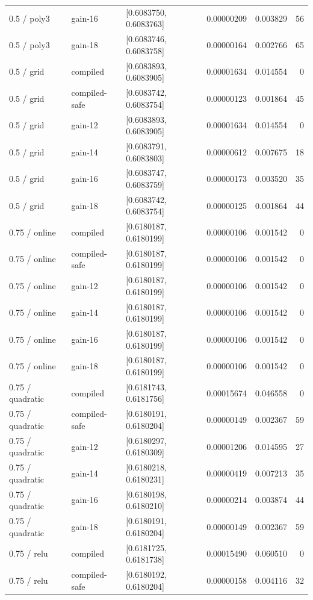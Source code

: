 \begin{longtable}{@{}lllrrr@{}}
0.5 / poly3 & gain-16 & [0.6083750, 0.6083763] & 0.00000209 & 0.003829 & 56\\
0.5 / poly3 & gain-18 & [0.6083746, 0.6083758] & 0.00000164 & 0.002766 & 65\\
0.5 / grid & compiled & [0.6083893, 0.6083905] & 0.00001634 & 0.014554 & 0\\
0.5 / grid & compiled-safe & [0.6083742, 0.6083754] & 0.00000123 & 0.001864 & 45\\
0.5 / grid & gain-12 & [0.6083893, 0.6083905] & 0.00001634 & 0.014554 & 0\\
0.5 / grid & gain-14 & [0.6083791, 0.6083803] & 0.00000612 & 0.007675 & 18\\
0.5 / grid & gain-16 & [0.6083747, 0.6083759] & 0.00000173 & 0.003520 & 35\\
0.5 / grid & gain-18 & [0.6083742, 0.6083754] & 0.00000125 & 0.001864 & 44\\
0.75 / online & compiled & [0.6180187, 0.6180199] & 0.00000106 & 0.001542 & 0\\
0.75 / online & compiled-safe & [0.6180187, 0.6180199] & 0.00000106 & 0.001542 & 0\\
0.75 / online & gain-12 & [0.6180187, 0.6180199] & 0.00000106 & 0.001542 & 0\\
0.75 / online & gain-14 & [0.6180187, 0.6180199] & 0.00000106 & 0.001542 & 0\\
0.75 / online & gain-16 & [0.6180187, 0.6180199] & 0.00000106 & 0.001542 & 0\\
0.75 / online & gain-18 & [0.6180187, 0.6180199] & 0.00000106 & 0.001542 & 0\\
0.75 / quadratic & compiled & [0.6181743, 0.6181756] & 0.00015674 & 0.046558 & 0\\
0.75 / quadratic & compiled-safe & [0.6180191, 0.6180204] & 0.00000149 & 0.002367 & 59\\
0.75 / quadratic & gain-12 & [0.6180297, 0.6180309] & 0.00001206 & 0.014595 & 27\\
0.75 / quadratic & gain-14 & [0.6180218, 0.6180231] & 0.00000419 & 0.007213 & 35\\
0.75 / quadratic & gain-16 & [0.6180198, 0.6180210] & 0.00000214 & 0.003874 & 44\\
0.75 / quadratic & gain-18 & [0.6180191, 0.6180204] & 0.00000149 & 0.002367 & 59\\
0.75 / relu & compiled & [0.6181725, 0.6181738] & 0.00015490 & 0.060510 & 0\\
0.75 / relu & compiled-safe & [0.6180192, 0.6180204] & 0.00000158 & 0.004116 & 32\\

\end{longtable}
